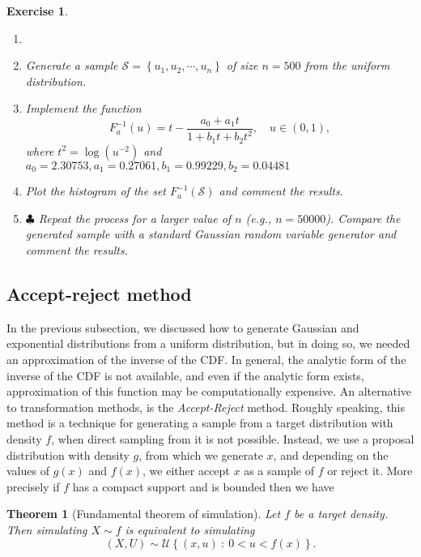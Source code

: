 \documentclass{article}\usepackage[]{graphicx}\usepackage[]{xcolor}
\newtheorem{exercise}{Exercise}
\newtheorem{theorem}{Theorem}
\begin{document}
  \begin{exercise}
  \begin{enumerate}
  \item[] 
  \item Generate a sample $\mathcal{S} = \left\{u_1, u_2, \cdots, u_n\right\}$ of size $n = 500$ from the uniform distribution.
  
  \item Implement the function
  \[
  F_a^{-1}(u) = t - \frac{a_0 + a_1t}{1+b_1t+b_2t^2}, \quad u\in(0,1),
  \]
  where $t^2 = \log\left(u^{-2}\right)$ and $a_0 = 2.30753, a_1 = 0.27061, b_1 = 0.99229, b_2 = 0.04481$
  
  \item Plot the histogram of the set $F_a^{-1}(\mathcal{S})$ and comment the results.
  
  \item$\clubsuit$ Repeat the process for a larger value of $n$ (e.g., $n = 50000$). Compare the generated sample with a standard Gaussian random variable generator and comment the results.
  
  \end{enumerate}
  \end{exercise}

\subsection{Accept-reject method}
In the previous subsection, we discussed how to generate Gaussian and exponential distributions from a uniform distribution, but in doing so, we needed an approximation of the inverse of the CDF. In general, the analytic form of the inverse of the CDF is not available, and even if the analytic form exists, approximation of this function may be computationally expensive. An alternative to transformation methods, is the \textit{Accept-Reject} method.
Roughly speaking, this method is a technique for generating a sample from a target distribution with density $f$, when direct sampling from it is not possible. Instead, we use a proposal distribution with density $g$, from which we generate $x$, and depending on the values of $g(x)$ and $f(x)$, we either accept $x$ as a sample of $f$ or reject it. More precisely if $f$ has a compact support and is bounded then we have 


\begin{theorem}[Fundamental theorem of simulation]\label{Accept-Reject theorem}
Let $f$ be a target density. Then simulating $X\sim f$ is equivalent to simulating 
\begin{equation}\label{Fund thm of sim eq}
\left(X, U\right) \sim \mathcal{U}\left\{(x,u)~:~0< u < f(x)\right\}.
\end{equation}

\end{theorem}
\end{document}
